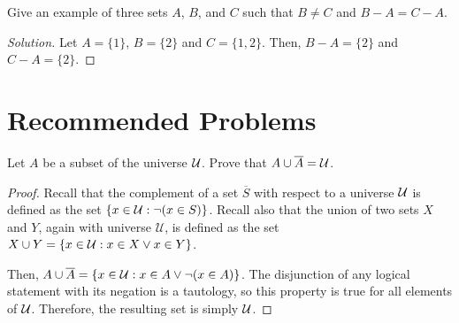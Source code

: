 \begin{warmup}
  Give an example of three sets $A$, $B$, and $C$ such that $B \neq C$ and $B-A = C-A$.
\end{warmup}
\begin{proof}[Solution]
  Let $A = \{1\}$, $B=\{2\}$ and $C=\{1,2\}$.
  Then, $B-A=\{2\}$ and $C-A=\{2\}$.
\end{proof}


\section{Recommended Problems}

\begin{recommended}
  Let $A$ be a subset of the universe $\mathcal{U}$.
  Prove that $A \cup \overline{A} = \mathcal{U}$.
\end{recommended}
\begin{proof}
  Recall that the complement of a set $\overline{S}$ with respect to a universe $\mathcal{U}$
  is defined as the set $\{x\in\mathcal{U}:\lnot(x\in S)\}$.
  Recall also that the union of two sets $X$ and $Y$, again with universe $\mathcal U$,
  is defined as the set $X\cup Y=\{x\in\mathcal{U}:x\in X\lor x\in Y\}$.

  Then, $A \cup \overline{A} = \{x\in\mathcal{U}:x \in A \lor \lnot (x \in A)\}$.
  The disjunction of any logical statement with its negation is a tautology, so this property is true for all elements of $\mathcal{U}$.
  Therefore, the resulting set is simply $\mathcal{U}$.
\end{proof}


